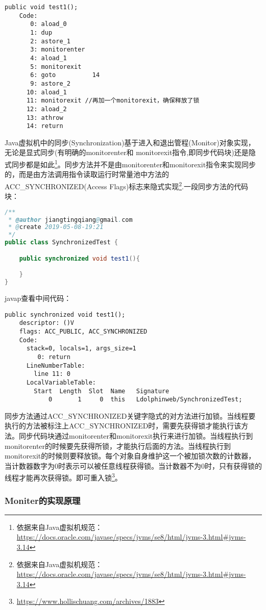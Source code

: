 \documentclass[../../../interview-questions.tex]{subfiles}
\begin{document}
\begin{lstlisting}
public void test1();
    Code:
       0: aload_0
       1: dup
       2: astore_1
       3: monitorenter
       4: aload_1
       5: monitorexit
       6: goto          14
       9: astore_2
      10: aload_1
      11: monitorexit //再加一个monitorexit，确保释放了锁
      12: aload_2
      13: athrow
      14: return
\end{lstlisting}

Java虚拟机中的同步(Synchronization)基于进入和退出管程(Monitor)对象实现，无论是显式同步(有明确的monitorenter和 monitorexit指令,即同步代码块)还是隐式同步都是如此\footnote{依据来自Java虚拟机规范：\url{https://docs.oracle.com/javase/specs/jvms/se8/html/jvms-3.html\#jvms-3.14}}。同步方法并不是由monitorenter和monitorexit指令来实现同步的，而是由方法调用指令读取运行时常量池中方法的ACC\_SYNCHRONIZED(Access Flags)标志来隐式实现\footnote{依据来自Java虚拟机规范：\url{https://docs.oracle.com/javase/specs/jvms/se8/html/jvms-3.html\#jvms-3.14}}.一段同步方法的代码块：

\begin{lstlisting}[language=Java]
/**
 * @author jiangtingqiang@gmail.com
 * @create 2019-05-08-19:21
 */
public class SynchronizedTest {

    public synchronized void test1(){

    }
}
\end{lstlisting}

javap查看中间代码：

\begin{lstlisting}
public synchronized void test1();
    descriptor: ()V
    flags: ACC_PUBLIC, ACC_SYNCHRONIZED
    Code:
      stack=0, locals=1, args_size=1
         0: return
      LineNumberTable:
        line 11: 0
      LocalVariableTable:
        Start  Length  Slot  Name   Signature
            0       1     0  this   Ldolphinweb/SynchronizedTest;
\end{lstlisting}

同步方法通过ACC\_SYNCHRONIZED关键字隐式的对方法进行加锁。当线程要执行的方法被标注上ACC\_SYNCHRONIZED时，需要先获得锁才能执行该方法。同步代码块通过monitorenter和monitorexit执行来进行加锁。当线程执行到monitorenter的时候要先获得所锁，才能执行后面的方法。当线程执行到monitorexit的时候则要释放锁。每个对象自身维护这一个被加锁次数的计数器，当计数器数字为0时表示可以被任意线程获得锁。当计数器不为0时，只有获得锁的线程才能再次获得锁。即可重入锁\footnote{\url{https://www.hollischuang.com/archives/1883}}。

\subsubsection{Moniter的实现原理}
\end{document}
